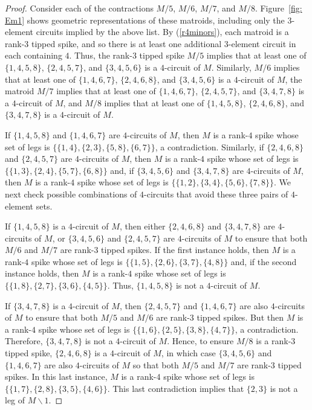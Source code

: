 \documentclass[11pt]{amsart}
\numberwithin{equation}{section} %
\begin{document}
\begin{proof}
Consider each of the contractions $M/5$, $M/6$, $M/7$, and $M/8$. Figure~\ref{fig: Em1} shows geometric representations of these matroids, including only the $3$-element circuits implied by the above list. By (\ref{r4minors}), each matroid is a rank-$3$ tipped spike, and so there is at least one additional $3$-element circuit in each containing $4$. Thus, the rank-$3$ tipped spike $M/5$ implies that at least one of $\{1, 4, 5, 8\}$, $\{2, 4, 5, 7\}$, and $\{3, 4, 5, 6\}$ is a $4$-circuit of $M$. Similarly, $M/6$ implies that at least one of $\{1, 4, 6, 7\}$, $\{2, 4, 6, 8\}$, and $\{3, 4, 5, 6\}$ is a $4$-circuit of $M$, the matroid $M/7$ implies that at least one of $\{1, 4, 6, 7\}$, $\{2, 4, 5, 7\}$,  and $\{3, 4, 7, 8\}$ is a $4$-circuit of $M$, and $M/8$ implies that at least one of $\{1, 4, 5, 8\}$, $\{2, 4, 6, 8\}$, and $\{3, 4, 7, 8\}$ is a $4$-circuit of $M$.

If $\{1, 4, 5, 8\}$ and $\{1, 4, 6, 7\}$ are $4$-circuits of $M$, then $M$ is a rank-$4$ spike whose set of legs is $\{\{1, 4\}, \{2, 3\}, \{5, 8\}, \{6, 7\}\}$, a contradiction.  Similarly, if $\{2, 4, 6, 8\}$ and $\{2, 4, 5, 7\}$ are $4$-circuits of $M$, then $M$ is a rank-$4$ spike whose set of legs is $\{\{1, 3\}, \{2, 4\}, \{5, 7\}, \{6, 8\}\}$ and, if $\{3, 4, 5, 6\}$ and $\{3, 4, 7, 8\}$ are $4$-circuits of $M$, then $M$ is a rank-$4$ spike whose set of legs is $\{\{1, 2\}, \{3, 4\}, \{5, 6\}, \{7, 8\}\}$. We next check  possible combinations of $4$-circuits that avoid these three pairs of $4$-element sets.

If $\{1, 4, 5, 8\}$ is a $4$-circuit of $M$, then either $\{2, 4, 6, 8\}$ and $\{3, 4, 7, 8\}$ are $4$-circuits of $M$, or $\{3, 4, 5, 6\}$ and $\{2, 4, 5, 7\}$ are $4$-circuits of $M$ to ensure that both $M/6$ and $M/7$ are rank-$3$ tipped spikes. If the first instance holds, then $M$ is a rank-$4$ spike whose set of legs is $\{\{1, 5\}, \{2, 6\}, \{3, 7\}, \{4, 8\}\}$ and, if the second instance holds, then $M$ is a rank-$4$ spike whose set of legs is $\{\{1, 8\}, \{2, 7\}, \{3, 6\}, \{4, 5\}\}$. Thus, $\{1, 4, 5, 8\}$ is not a $4$-circuit of $M$.

If $\{3, 4, 7, 8\}$ is a $4$-circuit of $M$, then $\{2, 4, 5, 7\}$ and $\{1, 4, 6, 7\}$ are also $4$-circuits of $M$ to ensure that both $M/5$ and $M/6$ are rank-$3$ tipped spikes. But then $M$ is a rank-$4$ spike whose set of legs is $\{\{1, 6\}, \{2, 5\}, \{3, 8\}, \{4, 7\}\}$, a contradiction. Therefore, $\{3, 4, 7, 8\}$ is not a $4$-circuit of $M$. Hence, to ensure $M/8$ is a rank-$3$ tipped spike, $\{2, 4, 6, 8\}$ is a $4$-circuit of $M$, in which case $\{3, 4, 5, 6\}$ and $\{1, 4, 6, 7\}$ are also $4$-circuits of $M$ so that both $M/5$ and $M/7$ are rank-$3$ tipped spikes. In this last instance, $M$ is a rank-$4$ spike whose set of legs is $\{\{1, 7\}, \{2, 8\}, \{3, 5\}, \{4, 6\}\}$. This last contradiction implies that $\{2, 3\}$ is not a leg of $M\backslash 1$.


\end{proof}
\end{document}
